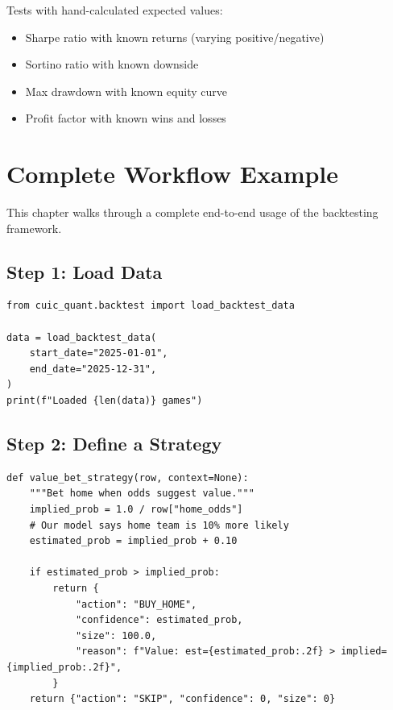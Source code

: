 \documentclass[12pt,a4paper]{report}
\theoremstyle{definition}
\begin{document}
Tests with hand-calculated expected values:
\begin{itemize}
    \item Sharpe ratio with known returns (varying positive/negative)
    \item Sortino ratio with known downside
    \item Max drawdown with known equity curve
    \item Profit factor with known wins and losses
\end{itemize}


\chapter{Complete Workflow Example}
\label{ch:workflow}

This chapter walks through a complete end-to-end usage of the backtesting framework.

\section{Step 1: Load Data}

\begin{lstlisting}[caption={Loading historical game data.}]
from cuic_quant.backtest import load_backtest_data

data = load_backtest_data(
    start_date="2025-01-01",
    end_date="2025-12-31",
)
print(f"Loaded {len(data)} games")
\end{lstlisting}

\section{Step 2: Define a Strategy}

\begin{lstlisting}[caption={A simple value-betting strategy.}]
def value_bet_strategy(row, context=None):
    """Bet home when odds suggest value."""
    implied_prob = 1.0 / row["home_odds"]
    # Our model says home team is 10% more likely
    estimated_prob = implied_prob + 0.10

    if estimated_prob > implied_prob:
        return {
            "action": "BUY_HOME",
            "confidence": estimated_prob,
            "size": 100.0,
            "reason": f"Value: est={estimated_prob:.2f} > implied={implied_prob:.2f}",
        }
    return {"action": "SKIP", "confidence": 0, "size": 0}
\end{lstlisting}
\end{document}
